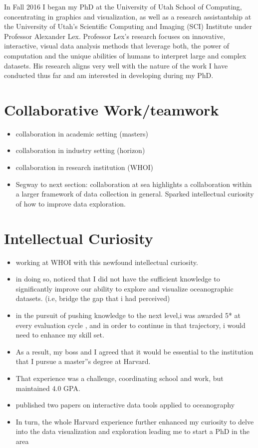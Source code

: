 In Fall 2016 I began my PhD at the University of Utah School of Computing, concentrating in graphics and visualization, as well as a research assistantship at the University of Utah’s Scientific Computing and Imaging (SCI) Institute under Professor Alexander Lex. Professor Lex’s research focuses on innovative, interactive, visual data analysis methods that leverage both, the power of computation and the unique abilities of humans to interpret large and complex datasets. His research aligns very well with the nature of the work I have conducted thus far and am interested in developing during my PhD.

\section*{Collaborative Work/teamwork}
\begin{itemize}
  \item collaboration in academic setting (masters)
  \item collaboration in industry setting (horizon)
  \item collaboration in research institution (WHOI)
  \item Segway to next section:  collaboration  at sea highlights a collaboration within a larger framework of data collection in general. Sparked intellectual curiosity of how to improve data exploration.  
\end{itemize}

\section*{Intellectual Curiosity}
\begin{itemize}
\item working at WHOI with this newfound intellectual curiosity.
\item in doing so, noticed that I did not have the sufficient knowledge to significantly improve our ability to explore and visualize oceanographic datasets. (i.e, bridge the gap that i had perceived)
\item in the pursuit of pushing knowledge to the next level,i was awarded 5* at every evaluation cycle , and in order to continue in that trajectory, i would need to enhance my skill set. 
\item As a result, my boss and I agreed that it would be essential to the institution that I pursue a master''s degree at Harvard. 
\item That experience was a challenge, coordinating school and work, but maintained 4.0 GPA.
\item published two papers on interactive data tools applied to oceanography 
\item In turn, the whole Harvard experience further enhanced my curiosity to delve into the data visualization and exploration leading me to start
a PhD in the area
\end{itemize}